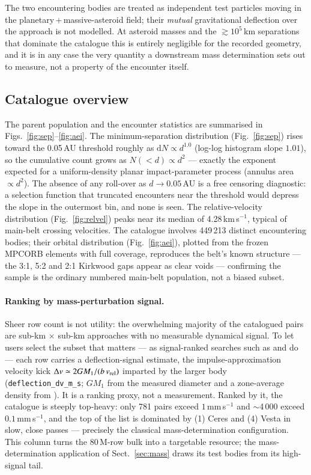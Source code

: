 \documentclass{aa}
\begin{document}
The two encountering bodies are treated as independent test particles moving in
the planetary\,+\,massive-asteroid field; their \emph{mutual} gravitational
deflection over the approach is not modelled. At asteroid masses and the
$\gtrsim10^5$\,km separations that dominate the catalogue this is entirely
negligible for the recorded geometry, and it is in any case the very quantity a
downstream mass determination sets out to measure, not a property of the
encounter itself.

\subsection{Catalogue overview}
\label{sec:overview}

The parent population and the encounter statistics are summarised in
Figs.~\ref{fig:sep}--\ref{fig:aei}. The minimum-separation distribution
(Fig.~\ref{fig:sep}) rises toward the 0.05\,AU threshold roughly as
$\mathrm{d}N \propto d^{1.0}$ (log-log histogram slope $1.01$), so the cumulative
count grows as $N(<d)\propto d^{2}$ --- exactly the exponent expected for a
uniform-density planar impact-parameter process (annulus area $\propto d^{2}$).
The absence of any roll-over as $d\to0.05$\,AU is a free censoring diagnostic: a
selection function that truncated encounters near the threshold would depress the
slope in the outermost bin, and none is seen. The relative-velocity
distribution (Fig.~\ref{fig:relvel}) peaks near its median of
4.28\,km\,s$^{-1}$, typical of main-belt crossing velocities. The catalogue
involves 449\,213 distinct encountering bodies; their orbital distribution
(Fig.~\ref{fig:aei}), plotted from the frozen MPCORB elements with full coverage,
reproduces the belt's known structure --- the 3:1, 5:2 and 2:1 Kirkwood gaps
appear as clear voids --- confirming the sample is the ordinary numbered
main-belt population, not a biased subset.

\paragraph{Ranking by mass-perturbation signal.} Sheer row count is not utility:
the overwhelming majority of the catalogued pairs are sub-km $\times$ sub-km
approaches with no measurable dynamical signal. To let users select the subset
that matters --- as signal-ranked searches such as \citet{ivantsov2018} and
\citet{fuentesmunoz2025} do --- each row carries a deflection-signal estimate,
the impulse-approximation velocity kick
$\Delta v \simeq 2GM_1/(b\,v_{\rm rel})$ imparted by the larger body
(\texttt{deflection\_dv\_m\_s}; $GM_1$ from the measured diameter and a
zone-average density from \citealp{carry2012}). It is a ranking proxy, not a
measurement. Ranked by it,
the catalogue is steeply top-heavy: only 781 pairs exceed $1$\,mm\,s$^{-1}$ and
$\sim$4\,000 exceed $0.1$\,mm\,s$^{-1}$, and the top of the list is dominated by
(1) Ceres and (4) Vesta in slow, close passes --- precisely the classical
mass-determination configuration. This column turns the 80\,M-row bulk into a
targetable resource; the mass-determination application of
Sect.~\ref{sec:mass} draws its test bodies from its high-signal tail.
\end{document}
